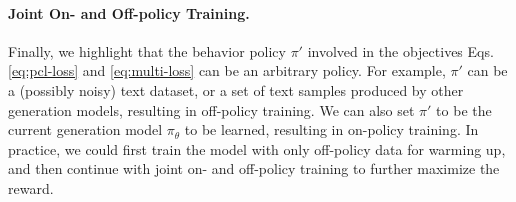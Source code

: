 \paragraph{Joint On- and Off-policy Training.} 
Finally, we highlight that the behavior policy $\pi'$ involved in the objectives Eqs.\eqref{eq:pcl-loss} and \eqref{eq:multi-loss} can be an arbitrary policy.
For example, $\pi'$ can be a (possibly noisy) text dataset, or a set of text samples produced by other generation models, resulting in off-policy training. We can also set $\pi'$ to be the current generation model $\pi_\theta$ to be learned, resulting in on-policy training. In practice, we could first train the model with only off-policy data for warming up, and then continue with joint on- and off-policy training to further maximize the reward.



